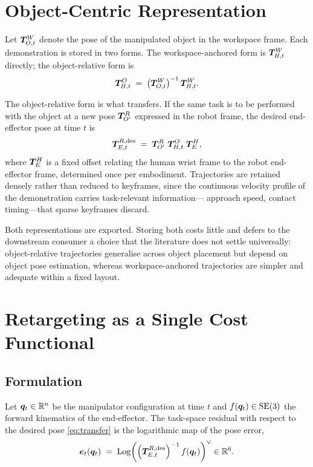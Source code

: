 \section{Object-Centric Representation}
\label{sec:objcentric}

Let $\bm{T}^{W}_{O,t}$ denote the pose of the manipulated object in the workspace
frame. Each demonstration is stored in two forms. The workspace-anchored form
is $\bm{T}^{W}_{H,t}$ directly; the object-relative form is
\begin{equation}
  \bm{T}^{O}_{H,t} \;=\; \left(\bm{T}^{W}_{O,t}\right)^{-1} \bm{T}^{W}_{H,t}.
  \label{eq:objrel}
\end{equation}

The object-relative form is what transfers. If the same task is to be performed
with the object at a new pose $\bm{T}^{R}_{O'}$ expressed in the robot frame, the
desired end-effector pose at time $t$ is
\begin{equation}
  \bm{T}^{R,\mathrm{des}}_{E,t} \;=\;
  \bm{T}^{R}_{O'} \; \bm{T}^{O}_{H,t} \; \bm{T}^{H}_{E},
  \label{eq:transfer}
\end{equation}
where $\bm{T}^{H}_{E}$ is a fixed offset relating the human wrist frame to the
robot end-effector frame, determined once per embodiment. Trajectories are
retained densely rather than reduced to keyframes, since the continuous
velocity profile of the demonstration carries task-relevant information---
approach speed, contact timing---that sparse keyframes discard.

Both representations are exported. Storing both costs little and defers to the
downstream consumer a choice that the literature does not settle universally:
object-relative trajectories generalise across object placement
\cite{orion, spot} but depend on object pose estimation, whereas
workspace-anchored trajectories are simpler and adequate within a fixed layout.

\section{Retargeting as a Single Cost Functional}
\label{sec:retarget}

\subsection{Formulation}

Let $\bm{q}_t \in \mathbb{R}^{n}$ be the manipulator configuration at time $t$ and
$f(\bm{q}_t) \in \mathrm{SE}(3)$ the forward kinematics of the end-effector. The task-space
residual with respect to the desired pose \eqref{eq:transfer} is the
logarithmic map of the pose error,
\begin{equation}
  \bm{e}_t(\bm{q}_t) \;=\;
  \operatorname{Log}\!\left(
    \left(\bm{T}^{R,\mathrm{des}}_{E,t}\right)^{-1} f(\bm{q}_t)
  \right)^{\vee} \in \mathbb{R}^{6}.
  \label{eq:residual}
\end{equation}

